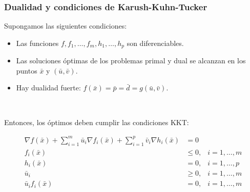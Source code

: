 \documentclass{beamer}
\begin{document}
\begin{frame}
\frametitle{Dualidad y condiciones de Karush-Kuhn-Tucker}

Supongamos las siguientes condiciones:

\begin{itemize}
\item Las funciones $f,f_1,\ldots, f_m,h_1,\ldots,h_p$ son diferenciables.
\item Las soluciones óptimas de los problemas primal y dual se alcanzan en los puntos
 $\bar{x}$ y $(\bar{u},\bar{v})$.
\item Hay dualidad fuerte: $f(\bar{x})=\bar{p}=\bar{d}=g(\bar{u},\bar{v})$.
\end{itemize}


\

Entonces, los óptimos deben cumplir las condiciones KKT:

\begin{align*}
\nabla f(\bar{x}) + \sum_{i=1}^m \bar{u}_i \nabla f_i(\bar{x}) + \sum_{i=1}^p \bar{v}_i\nabla h_i(\bar{x}) & = 0 \\
f_i(\bar{x}) &\leq 0, & i = 1,\ldots,m \\
h_i(\bar{x}) &= 0, & i = 1,\ldots,p \\
\bar{u}_i    & \geq 0, & i = 1,\ldots,m\\
\bar{u}_i f_i(\bar{x}) &  = 0, & i = 1,\ldots,m\\
\end{align*}

\end{frame}
\end{document}
